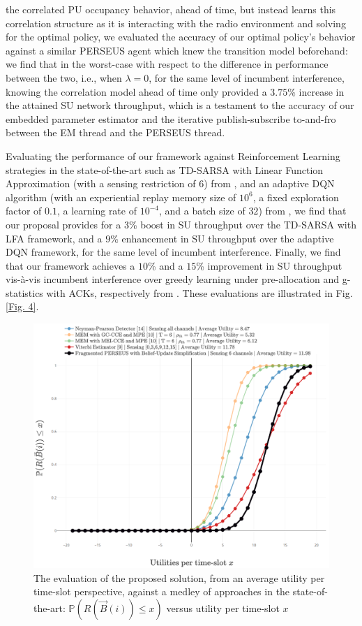 \documentclass[12pt, draftcls, onecolumn]{IEEEtran}
\begin{document}
the correlated PU occupancy behavior, ahead of time, but instead learns this correlation structure as it is interacting with the radio environment and solving for the optimal policy, we evaluated the accuracy of our optimal policy's behavior against a similar PERSEUS agent which knew the transition model beforehand: we find that in the worst-case with respect to the difference in performance between the two, i.e., when $\lambda{=}0$, for the same level of incumbent interference, knowing the correlation model ahead of time only provided a $3.75$\% increase in the attained SU network throughput, which is a testament to the accuracy of our embedded parameter estimator and the iterative publish-subscribe to-and-fro between the EM thread and the PERSEUS thread. 

Evaluating the performance of our framework against Reinforcement Learning strategies in the state-of-the-art such as TD-SARSA with Linear Function Approximation (with a sensing restriction of $6$) from \cite{WCL:5}, and an adaptive DQN algorithm (with an experiential replay memory size of $10^{6}$, a fixed exploration factor of $0.1$, a learning rate of $10^{-4}$, and a batch size of $32$) from \cite{WCL:DQN}, we find that our proposal provides for a $3$\% boost in SU throughput over the TD-SARSA with LFA framework, and a $9$\% enhancement in SU throughput over the adaptive DQN framework, for the same level of incumbent interference. Finally, we find that our framework achieves a $10$\% and a $15$\% improvement in SU throughput vis-à-vis incumbent interference over greedy learning under pre-allocation and g-statistics with ACKs, respectively from \cite{WCL:MIT}. These evaluations are illustrated in Fig. \ref{Fig. 4}.
\begin{figure} [htb]
    \centerline{
    \includegraphics[width = 0.8\linewidth]{figures/CDF_Single_Agent_Performance_Comparison.png}}
    \caption{The evaluation of the proposed solution, from an average utility per time-slot perspective, against a medley of approaches in the state-of-the-art: $\mathbb{P}(R(\vec{B}(i)){\leq}x)$ versus utility per time-slot $x$}
    \label{Fig. 5}
\end{figure}
\end{document}

